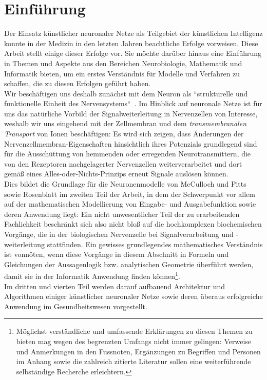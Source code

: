 \chapter{Einführung}

Der Einsatz künstlicher neuronaler Netze als Teilgebiet der künstlichen Intelligenz konnte in der Medizin in den letzten Jahren beachtliche Erfolge vorweisen.
Diese Arbeit stellt einige dieser Erfolge vor.
Sie möchte darüber hinaus eine Einführung in Themen und Aspekte aus den Bereichen Neurobiologie, Mathematik und Informatik bieten, um ein erstes Verständnis für Modelle und Verfahren zu schaffen, die zu diesen Erfolgen geführt haben.\\

Wir beschäftigen uns deshalb zunächst mit dem Neuron als ``strukturelle und funktionelle Einheit des Nervensystems``~\cite[42]{SD07}.
Im Hinblick auf neuronale Netze ist für uns das natürliche Vorbild der Signalweiterleitung in Nervenzellen von Interesse, weshalb wir uns eingehend mit der Zellmembran und dem \textit{transmembranalen Transport} von Ionen beschäftigen: Es wird sich zeigen, dass Änderungen der Nervenzellmembran-Eigenschaften hinsichtlich ihres Potenzials grundlegend sind für die Ausschüttung von hemmenden oder erregenden Neurotransmittern, die von den Rezeptoren nachgelagerter Nervenzellen weiterverarbeitet und dort gemäß eines Alles-oder-Nichts-Prinzips erneut Signale auslösen können.\\

Dies bildet die Grundlage für die Neuronenmodelle von McCulloch und Pitts sowie Rosenblatt im zweiten Teil der Arbeit, in dem der Schwerpunkt vor allem auf der mathematischen Modellierung von Eingabe- und Ausgabefunktion sowie deren Anwendung liegt: Ein nicht unwesentlicher Teil der zu erarbeitenden Fachlichkeit beschränkt sich also nicht bloß auf die hochkomplexen biochemischen Vorgänge, die in der biologischen Nervenzelle bei Signalverarbeitung und -weiterleitung stattfinden.
Ein gewisses grundlegendes mathematisches Verständnis ist vonnöten, wenn diese Vorgänge in diesem Abschnitt in Formeln und Gleichungen der Aussagenlogik {bzw.} analytischen Geometrie überführt werden, damit sie in der Informatik Anwendung finden können\footnote{
    Möglichst verständliche und umfassende Erklärungen zu diesen Themen zu bieten mag wegen des begrenzten Umfangs nicht immer gelingen: Verweise und Anmerkungen in den Fussnoten, Ergänzungen zu Begriffen und Personen im Anhang sowie die zahlreich zitierte Literatur sollen eine weiterführende selbständige Recherche erleichtern.
}.\\

Im dritten und vierten Teil werden darauf aufbauend Architektur und Algorithmen einiger künstlicher neuronaler Netze sowie deren überaus erfolgreiche Anwendung im Gesundheitswesen vorgestellt.
